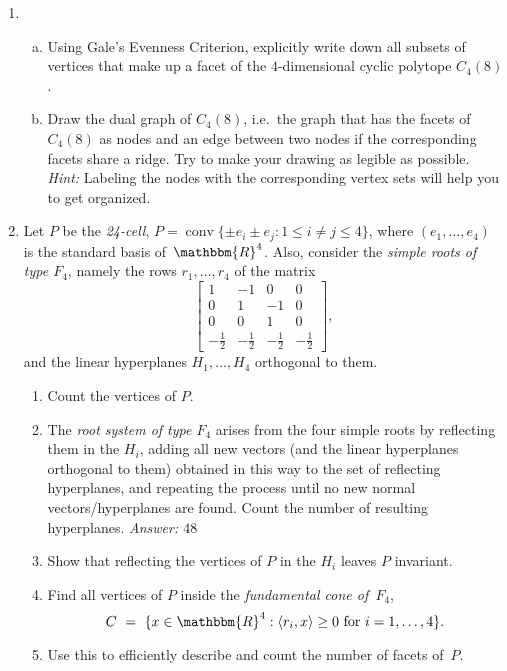 \documentclass[11pt]{amsart}
\DeclareMathOperator{\conv}{conv}
\newcommand{\RR}{\mathbbm{R}}
\begin{document}
\begin{enumerate}
\item
  \begin{enumerate}[(a)]
  \item Using Gale's Evenness Criterion, explicitly write down all
    subsets of vertices that make up a facet of the $4$-dimensional
    cyclic polytope $C_4(8)$.
  \item Draw the dual graph of $C_4(8)$, i.e.\ the graph that has the facets of $C_4(8)$ as nodes and an edge between two nodes if the corresponding facets share a ridge.
    Try to make your drawing as legible as possible. \emph{Hint:} Labeling the nodes with the corresponding vertex sets will help you to get organized.
\end{enumerate}
  \bigskip\bigskip
\item Let $P$ be the \emph{24-cell}, $P = \conv\{\pm e_i\pm e_j : 1\le i\ne j\le 4\}$, where $(e_1,\dots,e_4)$ is the standard basis of~$\RR^4$.
 Also, consider the \emph{simple roots of type $F_4$}, namely the rows $r_1,\dots,r_4$ of the matrix
    \[
      \begin{bmatrix}
        1 & -1 & 0 & 0 \\
        0 & 1 & -1 & 0 \\
        0 & 0 & 1 & 0 \\
        -\frac12 & -\frac12 & -\frac12 & -\frac12
      \end{bmatrix},
    \]
    and the linear hyperplanes $H_1,\dots,H_4$ orthogonal to them.
    \begin{enumerate}
      \item Count the vertices of $P$.
      \item The \emph{root system of type $F_4$} arises from the four
        simple roots by reflecting them in the $H_i$, adding all
        new vectors (and the linear hyperplanes orthogonal to them)
        obtained in this way to the set of reflecting hyperplanes, and
        repeating the process until no new normal vectors/hyperplanes
        are found. Count the number of resulting
        hyperplanes. \emph{Answer: $48$}
      \item Show that reflecting the vertices of $P$ in the $H_i$ leaves $P$ invariant.
      \item Find all vertices of $P$ inside the \emph{fundamental cone of~$F_4$},
        \[
          C
          \ = \
          \{x\in\RR^4:\langle r_i,x\rangle\ge0\text{ for }i=1,\dots,4\}.
          \]
      \item Use this to efficiently describe and count the number of facets of~$P$.
      \end{enumerate}
\end{enumerate}
\end{document}
